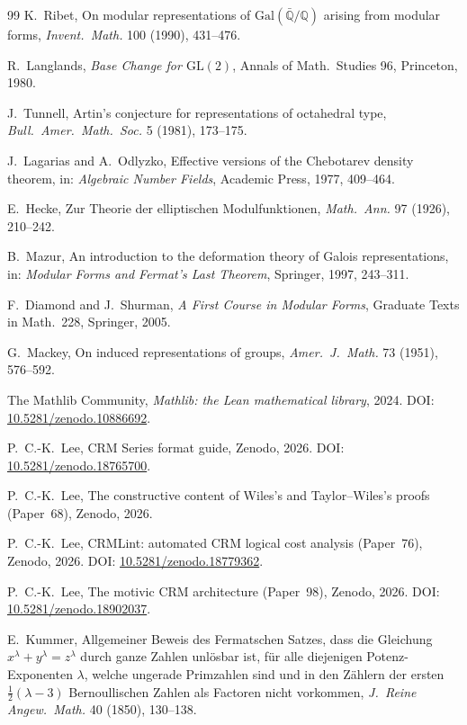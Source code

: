 \documentclass[11pt,a4paper]{article}
\theoremstyle{plain}
\theoremstyle{definition}
\newcommand{\Q}{\mathbb{Q}}
\newcommand{\Gal}{\mathrm{Gal}}
\newcommand{\GL}{\mathrm{GL}}
\begin{document}
\begin{thebibliography}{99}
 K.\ Ribet, On modular representations of $\Gal(\bar{\Q}/\Q)$ arising from modular forms, \emph{Invent.\ Math.} 100 (1990), 431--476.

 R.\ Langlands, \emph{Base Change for $\GL(2)$}, Annals of Math.\ Studies 96, Princeton, 1980.

 J.\ Tunnell, Artin's conjecture for representations of octahedral type, \emph{Bull.\ Amer.\ Math.\ Soc.} 5 (1981), 173--175.

 J.\ Lagarias and A.\ Odlyzko, Effective versions of the Chebotarev density theorem, in: \emph{Algebraic Number Fields}, Academic Press, 1977, 409--464.

 E.\ Hecke, Zur Theorie der elliptischen Modulfunktionen, \emph{Math.\ Ann.} 97 (1926), 210--242.

 B.\ Mazur, An introduction to the deformation theory of Galois representations, in: \emph{Modular Forms and Fermat's Last Theorem}, Springer, 1997, 243--311.

 F.\ Diamond and J.\ Shurman, \emph{A First Course in Modular Forms}, Graduate Texts in Math.~228, Springer, 2005.

 G.\ Mackey, On induced representations of groups, \emph{Amer.\ J.\ Math.} 73 (1951), 576--592.

 The Mathlib Community, \emph{Mathlib: the Lean mathematical library}, 2024. DOI: \href{https://doi.org/10.5281/zenodo.10886692}{10.5281/zenodo.10886692}.

 P.\ C.-K.\ Lee, CRM Series format guide, Zenodo, 2026. DOI: \href{https://doi.org/10.5281/zenodo.18765700}{10.5281/zenodo.18765700}.

 P.\ C.-K.\ Lee, The constructive content of Wiles's and Taylor--Wiles's proofs (Paper~68), Zenodo, 2026.

 P.\ C.-K.\ Lee, CRMLint: automated CRM logical cost analysis (Paper~76), Zenodo, 2026. DOI: \href{https://doi.org/10.5281/zenodo.18779362}{10.5281/zenodo.18779362}.

 P.\ C.-K.\ Lee, The motivic CRM architecture (Paper~98), Zenodo, 2026. DOI: \href{https://doi.org/10.5281/zenodo.18902037}{10.5281/zenodo.18902037}.

 E.\ Kummer, Allgemeiner Beweis des Fermatschen Satzes, dass die Gleichung $x^\lambda + y^\lambda = z^\lambda$ durch ganze Zahlen unl\"osbar ist, f\"ur alle diejenigen Potenz-Exponenten $\lambda$, welche ungerade Primzahlen sind und in den Z\"ahlern der ersten $\frac{1}{2}(\lambda - 3)$ Bernoullischen Zahlen als Factoren nicht vorkommen, \emph{J.\ Reine Angew.\ Math.} 40 (1850), 130--138.


\end{thebibliography}
\end{document}
